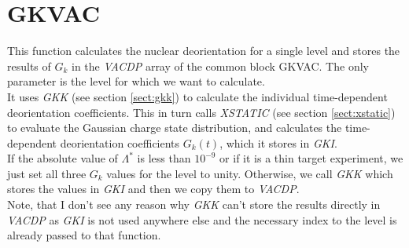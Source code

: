 \section{GKVAC}
\label{sect:gkvac}

\noindent This function calculates the nuclear deorientation for a single
level and stores the results of $G_k$ in the {\em VACDP} array of the common
block GKVAC. The only parameter is the level for which we want to
calculate.\\

\noindent It uses {\em GKK} (see section \ref{sect:gkk}) to calculate the
individual time-dependent deorientation coefficients. This in turn calls
{\em XSTATIC} (see section \ref{sect:xstatic}) to evaluate the Gaussian
charge state distribution, and calculates the time-dependent deorientation
coefficients $G_k(t)$, which it stores in {\em GKI}.\\

\noindent If the absolute value of $\Lambda^*$ is less than $10^{-9}$ or if
it is a thin target experiment, we just set all three $G_k$ values for the
level to unity. Otherwise, we call {\em GKK} which stores the values in {\em
GKI} and then we copy them to {\em VACDP}.\\

\noindent Note, that I don't see any reason why {\em GKK} can't store the
results directly in {\em VACDP} as {\em GKI} is not used anywhere else and
the necessary index to the level is already passed to that function.\\

